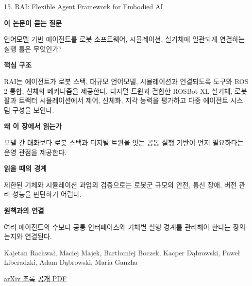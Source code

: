 \documentclass[11pt,openany]{book}
\begin{document}
\begin{termcard}{15. RAI: Flexible Agent Framework for Embodied AI}

\par

\medskip

{\sffamily\bfseries\color{deepblue} 이 논문이 묻는 질문}\par

언어모델 기반 에이전트를 로봇 소프트웨어, 시뮬레이션, 실기체에 일관되게 연결하는 실행 틀은 무엇인가?

\smallskip

{\sffamily\bfseries\color{deepblue} 핵심 구조}\par

RAI는 에이전트가 로봇 스택, 대규모 언어모델, 시뮬레이션과 연결되도록 도구와 ROS 2 통합, 신체화 메커니즘을 제공한다. 디지털 트윈과 결합한 ROSBot XL 실기체, 로봇 팔과 트랙터 시뮬레이션에서 제어, 신체화, 지각 능력을 평가하고 다중 에이전트 시스템 구성을 보인다.

\smallskip

{\sffamily\bfseries\color{deepblue} 왜 이 장에서 읽는가}\par

모델 간 대화보다 로봇 스택과 디지털 트윈을 잇는 공통 실행 기반이 먼저 필요하다는 운영 관점을 제공한다.

\smallskip

{\sffamily\bfseries\color{coral} 읽을 때의 경계}\par

제한된 기체와 시뮬레이션 과업의 검증으로는 로봇군 규모의 안전, 통신 장애, 버전 관리 성능을 판단하기 어렵다.

\smallskip

{\sffamily\bfseries\color{teal} 원책과의 연결}\par

여러 에이전트의 수보다 공통 인터페이스와 기체별 실행 경계를 관리해야 한다는 장의 논지와 연결된다.

\medskip

{\footnotesize\color{muted} Kajetan Rachwał, Maciej Majek, Bartłomiej Boczek, Kacper Dąbrowski, Paweł Liberadzki, Adam Dąbrowski, Maria Ganzha\par

\href{https://arxiv.org/abs/2505.07532}{arXiv 초록} \quad \href{https://arxiv.org/pdf/2505.07532}{공개 PDF}\par}

\end{termcard}
\end{document}
